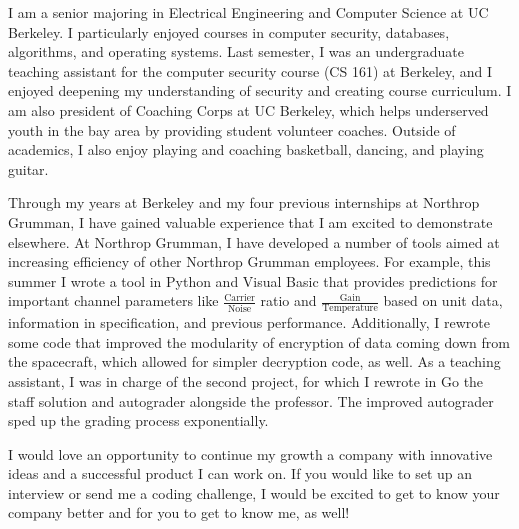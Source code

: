 \documentclass[11pt, a4paper]{awesome-cv}
\begin{document}
\makecvheader

\makelettertitle

\begin{cvletter}
I am a senior majoring in Electrical Engineering and Computer Science at UC Berkeley. I particularly enjoyed courses in computer security, databases, algorithms, and operating systems. Last semester, I was an undergraduate teaching assistant for the computer security course (CS 161) at Berkeley, and I enjoyed deepening my understanding of security and creating course curriculum. I am also president of Coaching Corps at UC Berkeley, which helps underserved youth in the bay area by providing student volunteer coaches. Outside of academics, I also enjoy playing and coaching basketball, dancing, and playing guitar.

Through my years at Berkeley and my four previous internships at Northrop Grumman, I have gained valuable experience that I am excited to demonstrate elsewhere. At Northrop Grumman, I have developed a number of tools aimed at increasing efficiency of other Northrop Grumman employees. For example, this summer I wrote a tool in Python and Visual Basic that provides predictions for important channel parameters like $\frac{\text{Carrier}}{\text{Noise}}$ ratio and $\frac{\text{Gain}}{\text{Temperature}}$ based on unit data, information in specification, and previous performance. Additionally, I rewrote some code that improved the modularity of encryption of data coming down from the spacecraft, which allowed for simpler decryption code, as well. As a teaching assistant, I was in charge of the second project, for which I rewrote in Go the staff solution and autograder alongside the professor. The improved autograder sped up the grading process exponentially.

I would love an opportunity to continue my growth a company with innovative ideas and a successful product I can work on. If you would like to set up an interview or send me a coding challenge, I would be excited to get to know your company better and for you to get to know me, as well!

\end{cvletter}

\makeletterclosing
\end{document}
